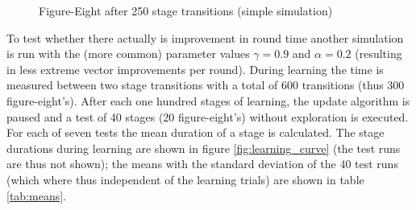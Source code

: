 \documentclass[11pt]{article}
\begin{document}
\begin{figure}[ht]
\centering



\caption{Figure-Eight after 250 stage transitions (simple simulation)}
\end{figure}


To test whether there actually is improvement in round time another simulation is run with the (more common) parameter values $\gamma = 0.9$ and $\alpha = 0.2$ (resulting in less extreme vector improvements per round). During learning the time is measured between two stage transitions with a total of 600 transitions (thus 300 figure-eight's). After each one hundred stages of learning, the update algorithm is paused and a test of 40 stages (20 figure-eight's) without exploration is executed. For each of seven tests the mean duration of a stage is calculated. The stage durations during learning are shown in figure \ref{fig:learning_curve} (the test runs are thus not shown); the means with the standard deviation of the 40 test runs (which where thus independent of the learning trials) are shown in table \ref{tab:means}.
\end{document}
